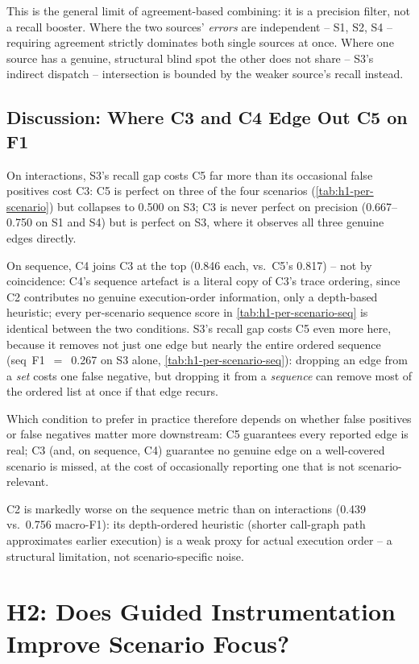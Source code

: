 This is the general limit of agreement-based combining: it is a
precision filter, not a recall booster. Where the two sources'
\emph{errors} are independent -- S1, S2, S4 -- requiring agreement
strictly dominates both single sources at once. Where one source has a
genuine, structural blind spot the other does not share -- S3's
indirect dispatch -- intersection is bounded by the weaker source's
recall instead.

\subsection{Discussion: Where C3 and C4 Edge Out C5 on F1}\label{sec:h1-c5}

On interactions, S3's recall gap costs C5 far more than its occasional
false positives cost C3: C5 is perfect on three of the four scenarios
(\cref{tab:h1-per-scenario}) but collapses to 0.500 on S3; C3 is never
perfect on precision (0.667--0.750 on S1 and S4) but is perfect on S3,
where it observes all three genuine edges directly.

On sequence, C4 joins C3 at the top (0.846 each, vs.\ C5's 0.817) --
not by coincidence: C4's sequence artefact is a literal copy of C3's
trace ordering, since C2 contributes no genuine execution-order
information, only a depth-based heuristic; every
per-scenario sequence score in \cref{tab:h1-per-scenario-seq} is
identical between the two conditions. S3's recall gap costs C5 even
more here, because it removes not just one edge but nearly the entire
ordered sequence (seq~F1~$=$~0.267 on S3 alone,
\cref{tab:h1-per-scenario-seq}): dropping an edge from a \emph{set}
costs one false negative, but dropping it from a \emph{sequence} can
remove most of the ordered list at once if that edge recurs.

Which condition to prefer in practice therefore depends on whether
false positives or false negatives matter more downstream: C5
guarantees every reported edge is real; C3 (and, on sequence, C4)
guarantee no genuine edge on a well-covered scenario is missed, at the
cost of occasionally reporting one that is not scenario-relevant.

C2 is markedly worse on the sequence metric than on interactions (0.439
vs.\ 0.756 macro-F1): its depth-ordered heuristic (shorter call-graph
path approximates earlier execution) is a weak
proxy for actual execution order -- a structural limitation, not
scenario-specific noise.

\section{H2: Does Guided Instrumentation Improve Scenario Focus?}\label{sec:h2}

